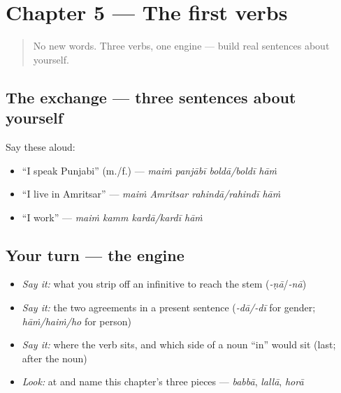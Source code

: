 \section[Practice]{Chapter 5 — The first verbs}

\label{lesson:PA-C05-practice}



\begin{quote}
No new words. Three verbs, one engine — build real sentences about yourself.
\end{quote}

\subsection*{The exchange — three sentences about yourself}
Say these aloud:

\begin{itemize}
\raggedright
  \item \textquotedblleft{}I speak Punjabi\textquotedblright{} (m./f.) — \emph{maiṁ panjābī boldā/boldī hāṁ}
  \item \textquotedblleft{}I live in Amritsar\textquotedblright{} — \emph{maiṁ Amritsar rahindā/rahindī hāṁ}
  \item \textquotedblleft{}I work\textquotedblright{} — \emph{maiṁ kamm kardā/kardī hāṁ}
\end{itemize}

\subsection*{Your turn — the engine}
\begin{itemize}
\raggedright
  \item \emph{Say it:} what you strip off an infinitive to reach the stem (\emph{-ṇā}/\emph{-nā})
  \item \emph{Say it:} the two agreements in a present sentence (\emph{-dā/-dī} for gender; \emph{hāṁ/haiṁ/ho} for person)
  \item \emph{Say it:} where the verb sits, and which side of a noun \textquotedblleft{}in\textquotedblright{} would sit (last; after the noun)
  \item \emph{Look:} at \textbf{} and name this chapter's three pieces — \emph{babbā}, \emph{lallā}, \emph{horā}
\end{itemize}

